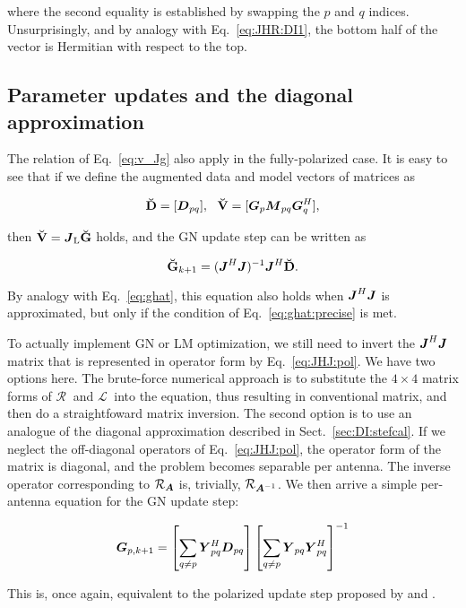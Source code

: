 \documentclass[useAMS,usenatbib]{mn2e}
\newcommand{\mat}[1]{{\bmath{#1}}}
\newcommand{\JJ}{\mat{J}} %
\newcommand{\DD}{\mat{D}}
\newcommand{\MM}{\mat{M}}
\newcommand{\GG}{\mat{G}}
\newcommand{\JHJ}{\JJ^H\JJ} %
\newcommand{\AUGx}[1]{\mathbf{\breve{#1}}}
\newcommand{\GGg}{\AUGx{G}}
\newcommand{\DDd}{\AUGx{D}}
\newcommand{\VVv}{\AUGx{V}}
\newcommand{\LEFT}{\mathrm{L}}
\newcommand{\Rop}[1]{\mathcal{R}_{{#1}}}
\newcommand{\Lop}[1]{\mathcal{L}_{{#1}}}
\newcommand{\StefCal}{{\sc StefCal}}
\begin{document}
where the second equality is established by swapping the $p$ and $q$ indices. Unsurprisingly, and by analogy with 
Eq.~\ref{eq:JHR:DI1}, the bottom half of the vector is Hermitian with respect to the top.

\subsection{Parameter updates and the diagonal approximation}

The relation of Eq.~\ref{eq:v_Jg} also apply in the fully-polarized case. It is easy to see that if we define the augmented 
data and model vectors of matrices as

\[
\DDd = [ \DD_{pq} ],~~\VVv = [ \GG_p \MM_{pq} \GG_q^H ],
\]

then $\VVv = \JJ_\LEFT \GGg$ holds, and the GN update step can be written as

\begin{equation}
\label{eq:ghat:matrix}
\GGg_{k+1} = (\JHJ)^{-1} \JJ^H \DDd.
\end{equation}

By analogy with Eq.~\ref{eq:ghat}, this equation also holds when $\JHJ$ is approximated, but only if the condition of Eq.~\ref{eq:ghat:precise} is met.

To actually implement GN or LM optimization, we still need to invert the  $\JHJ$ matrix that is represented in operator form 
by Eq.~\ref{eq:JHJ:pol}. We have two options here. The brute-force numerical approach is to substitute the 
$4\times4$ matrix forms of $\Rop{~}$ and $\Lop{~}$ into the equation, thus resulting in conventional matrix,
and then do a straightfoward matrix inversion. The second option is to use an analogue of the diagonal 
approximation described in Sect.~\ref{sec:DI:stefcal}. If we neglect the off-diagonal operators of Eq.~\ref{eq:JHJ:pol}, 
the operator form of the matrix is diagonal, and the problem becomes separable per antenna. The inverse operator 
corresponding to $\Rop{\mat{A}}$ is, trivially, $\Rop{\mat{A}^{-1}}$. We then arrive a simple per-antenna equation 
for the GN update step:

\begin{equation}
\label{eq:update:DI:diag:pol}
\GG_{p,k+1} =  
\left [ \sum\limits_{q\ne p} \YY^H_{pq} \DD_{pq} \right ] 
\left [ \sum\limits_{q\ne p} \YY_{pq} \YY^H_{pq}  \right ]^{-1}
\end{equation}

This is, once again, equivalent to the polarized {\sc \StefCal} update step proposed by \citet{OMS-Stefcal} and \citet{Stefcal}.
\end{document}
